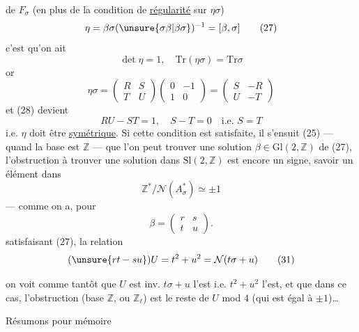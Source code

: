 de $F_\sigma$ (en plus de la condition de \uline{régularité} sur $\eta\sigma$)
\[
\eta=\beta\sigma(\unsure{\sigma\beta|\beta\sigma})^{-1}=[\beta,\sigma] \tag{27}
\]
c'est qu'on ait
\[
\det\eta=1,\quad \mathrm{Tr}(\eta\sigma)=\mathrm{Tr}\sigma \tag{28}
\]
or
\[
\eta\sigma=\begin{pmatrix}R&S\\T&U\end{pmatrix}
\begin{pmatrix}0&-1\\1&0\end{pmatrix}
=\begin{pmatrix}S&-R\\U&-T\end{pmatrix}
\]
et (28) devient
\[
RU-ST=1,\quad S-T=0\quad\text{i.e. }S=T \tag{29}
\]
i.e. $\eta$ doit être \uline{symétrique}.  Si cette condition est satisfaite, il s'ensuit  (25) --- quand la base est $\mathbb{Z}$ --- que l'on peut trouver une solution $\beta\in\mathrm{Gl}(2,\mathbb{Z})$ de (27), l'obstruction à trouver une solution dans $\mathrm{Sl}(2,\mathbb{Z})$ est encore un signe, savoir un élément dans
\[
\mathbb{Z}^*/\mathcal{N}(A_\sigma^*)\simeq\pm1
\]
--- comme on a, pour
\[
\beta=\begin{pmatrix}r&s\\t&u\end{pmatrix}. \tag{30}
\]
 satisfaisant (27), la relation
\[
(\unsure{rt-su})U=t^2+u^2=\mathcal{N}(t\sigma+u) \tag{31}
\]


on voit comme tantôt que $U$ est inv.  $t\sigma+u$ l'est i.e. $t^2+u^2$ l'est, et que dans ce cas, l'obstruction  (base $\mathbb{Z}$, ou $\mathbb{Z}_\ell$) est le reste de $U$ mod $4$ (qui est égal à $\pm1$)\ldots
{}

Résumons pour mémoire

